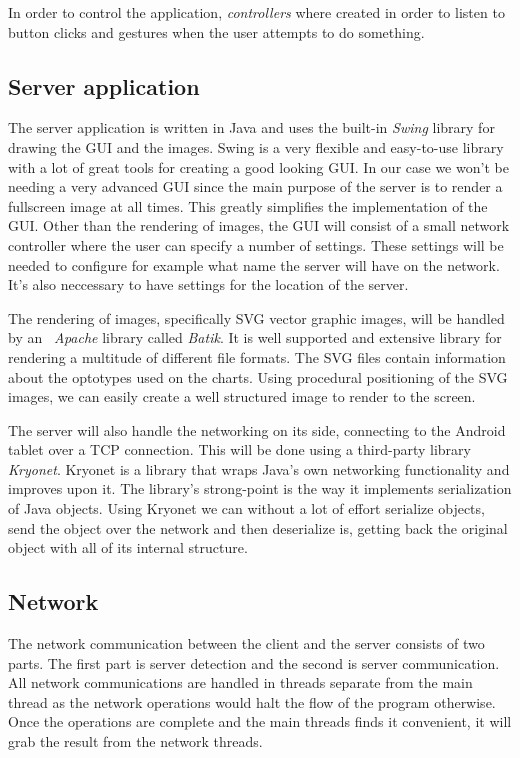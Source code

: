 \documentclass[12pt,a4paper,notitlepage]{report}
\begin{document}
In order to control the application, \textit{controllers} where created in order to listen to button clicks and gestures when the user attempts to do something.

\subsection{Server application}
The server application is written in Java and uses the built-in \textit{Swing} library for drawing the GUI and the images. Swing is a very flexible and easy-to-use library with a lot of great tools for creating a good looking GUI. In our case
we won't be needing a very advanced GUI since the main purpose of the server is to render a fullscreen image at all times. This greatly simplifies the implementation of the GUI. Other than the rendering of images, the GUI will consist of a small network controller where the user can specify a number of settings. These settings will be needed to configure for example what name the server will have on the network. It's also neccessary to have settings for the location of the server.  

The rendering of images, specifically SVG vector graphic images, will be handled by an \textit{~Apache} library called \textit{Batik}. It is well supported and extensive library for rendering a multitude of different file formats. The SVG files contain information about the optotypes used on the charts. Using procedural positioning of the SVG images, we can easily create a well structured image to render to the screen.

The server will also handle the networking on its side, connecting to the Android tablet over a TCP connection. This will be done using a third-party library \textit{Kryonet}. \cite{kryonet} Kryonet is a library that wraps Java's own networking functionality and improves upon it. The library's strong-point is the way it implements serialization of Java objects. Using Kryonet we can without a lot of effort serialize objects, send the object over the network and then deserialize is, getting back the original object with all of its internal structure.

\subsection{Network}
The network communication between the client and the server consists of two parts. The first part is server detection and the second is server communication. All network communications are handled in threads separate from the main thread as the network operations would halt the flow of the program otherwise. Once the operations are complete and the main threads finds it convenient, it will grab the result from the network threads.
\end{document}
